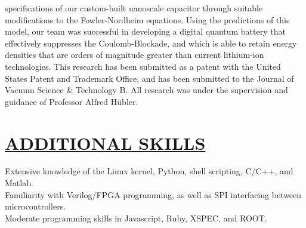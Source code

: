 \documentclass{res}
\begin{document}
\begin{resume}
        specifications of our custom-built nanoscale capacitor through suitable
        modifications to the Fowler-Nordheim equations.  Using the predictions
        of this model, our team was successful in developing a digital quantum
        battery that effectively suppresses the Coulomb-Blockade, and which is
        able to retain energy densities that are orders of magnitude greater
        than current lithium-ion technologies. This research has been submitted
        as a patent with the United States Patent and Trademark Office, and has
        been submitted to the Journal of Vacuum Science \& Technology B. All
        research was under the supervision and guidance of Professor
        Alfred H\"{u}bler.



\section{\underline{ADDITIONAL SKILLS}}
\vspace{1.5mm}
    Extensive knowledge of the Linux kernel, Python, shell scripting, C/C++, and Matlab. \\
    Familiarity with Verilog/FPGA programming, as well as SPI interfacing between microcontrollers.\\
    Moderate programming skills in Javascript, Ruby, XSPEC, and ROOT. \\


\end{resume}
\end{document}

